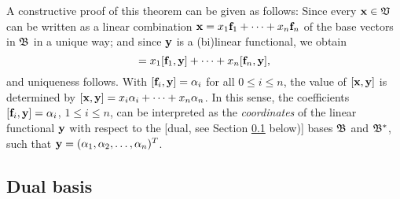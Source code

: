 A constructive proof of this theorem can be given as follows:
Since every ${\bf x}\in {\frak V}$
can be written as a linear combination
$ {\bf x} = x_1 {\bf f}_1 +\cdots + x_n {\bf f}_n$
of the base vectors in ${\frak B}$ in a unique way;
and since ${\bf y}$ is a (bi)linear functional, we obtain
\begin{equation}
[{\bf x},{\bf y}]
=
x_1 [{\bf f}_1 ,{\bf y}] +\cdots + x_n [{\bf f}_n ,{\bf y}] ,
\end{equation}
and uniqueness follows.
With $[{\bf f}_i ,{\bf y}] = \alpha_i$  for all  $0\le i \le n$,
the value of
$[{\bf x},{\bf y}]$ is determined by
$[{\bf x},{\bf y}] = x_i\alpha_i + \cdots + x_n\alpha_n$.
In this sense, the coefficients $[{\bf f}_i ,{\bf y}] = \alpha_i$,
$1\le i \le n$, can be interpreted
as the {\em coordinates} of the linear functional ${\bf y}$ with respect to the [dual, see Section \ref{2011-m-Dualbasis} below)]
bases ${\frak B}$ and ${\frak B}^\ast$, such that ${\bf y}=(\alpha_1,\alpha_2,\ldots , \alpha_n)^T$.

\subsection{Dual basis}
\label{2011-m-Dualbasis}

